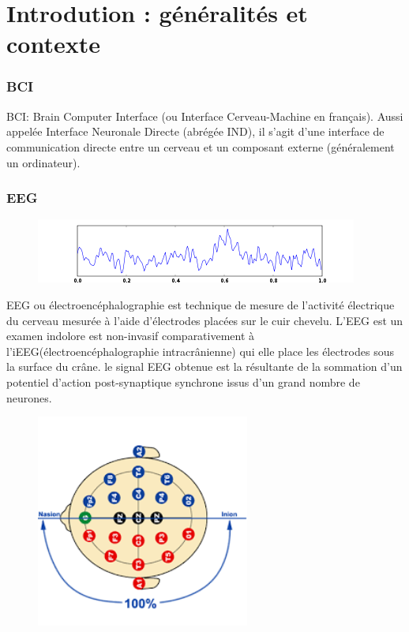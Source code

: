 \part{Introdution : généralités et contexte} %
\label{prt:introduction_ _théorique_}
	
	\section{BCI} %
	\label{sec:intro_bci}
	
	BCI: Brain Computer Interface (ou Interface Cerveau-Machine en français).
	Aussi appelée Interface Neuronale Directe (abrégée IND), il s'agit d'une interface de communication directe entre un cerveau et un composant externe (généralement un ordinateur).

	
	\section{EEG} %
	\label{sec:eeg}
	\begin{figure}[h!]
			\centering
		    \includegraphics []{figures/eeg_1s_signal.png} \\
			\label{fig_eeg_1s}
	\end{figure}
	EEG ou électroencéphalographie est technique de mesure de l'activité électrique du cerveau mesurée à l'aide d'électrodes placées sur le cuir chevelu. L'EEG est un examen indolore est non-invasif comparativement à l'iEEG(électroencéphalographie intracrânienne) qui elle place les électrodes sous la surface du crâne. le signal EEG obtenue est la résultante de la sommation d'un potentiel d'action post-synaptique synchrone issus d'un grand nombre de neurones.
	\begin{figure}
		\centering 
	 	\includegraphics [width=7cm,height=7cm]{figures/captoreeg.png} \\
		\label{fig_captors}	
	\end{figure}

